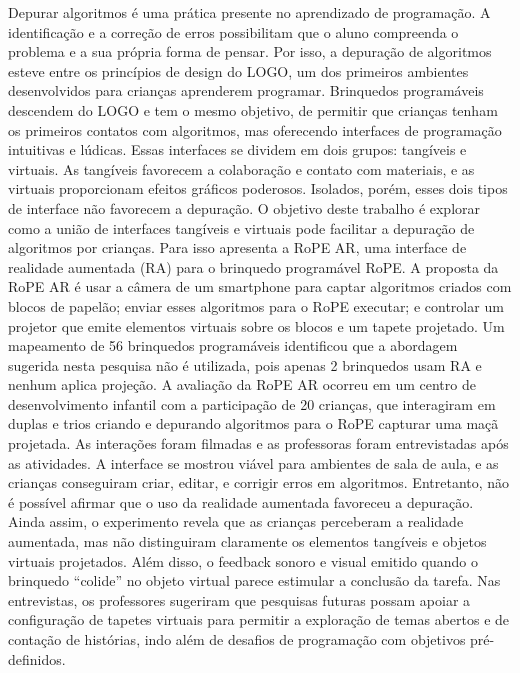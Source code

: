 \setlength{\absparsep}{14pt} 
\begin{resumo}

Depurar algoritmos é uma prática presente no aprendizado de programação. A identificação e a correção de erros possibilitam que o aluno compreenda o problema e a sua própria forma de pensar.  Por isso, a depuração de algoritmos esteve entre os princípios de design do LOGO, um dos primeiros ambientes desenvolvidos para crianças aprenderem programar.  Brinquedos programáveis descendem do LOGO e tem o mesmo objetivo, de permitir que crianças tenham os primeiros contatos com algoritmos, mas oferecendo interfaces de programação intuitivas e lúdicas. Essas interfaces se dividem em dois grupos: tangíveis e virtuais. As tangíveis favorecem a colaboração e contato com materiais, e as virtuais proporcionam efeitos gráficos poderosos. Isolados, porém, esses dois tipos de interface não favorecem a depuração. O objetivo deste trabalho é explorar como a união de interfaces tangíveis e virtuais pode facilitar a depuração de algoritmos por crianças. Para isso apresenta a RoPE AR, uma interface de realidade aumentada (RA) para o brinquedo programável RoPE. A proposta da RoPE AR é usar a câmera de um smartphone para captar algoritmos criados com blocos de papelão; enviar esses algoritmos para o RoPE executar; e controlar um projetor que emite elementos virtuais sobre os blocos e um tapete projetado. Um mapeamento de 56 brinquedos programáveis identificou que a abordagem sugerida nesta pesquisa não é utilizada, pois apenas 2 brinquedos usam RA e nenhum aplica projeção.  A avaliação da RoPE AR ocorreu em um centro de desenvolvimento infantil com a participação de 20 crianças, que interagiram em duplas e trios criando e depurando algoritmos para o RoPE capturar uma maçã projetada. As interações foram filmadas e as professoras foram entrevistadas após as atividades. A interface se mostrou viável para ambientes de sala de aula, e as crianças conseguiram criar, editar, e corrigir erros em algoritmos. Entretanto, não é possível afirmar que o uso da realidade aumentada favoreceu a depuração. Ainda assim, o experimento revela que as crianças perceberam a realidade aumentada, mas não distinguiram claramente os elementos tangíveis e objetos virtuais projetados. Além disso, o feedback sonoro e visual emitido quando o brinquedo “colide” no objeto virtual parece estimular a conclusão da tarefa. Nas entrevistas, os professores sugeriram que pesquisas futuras possam apoiar a configuração de tapetes virtuais para permitir a exploração de temas abertos e de contação de histórias, indo além de desafios de programação com objetivos pré-definidos. 

\end{resumo}
